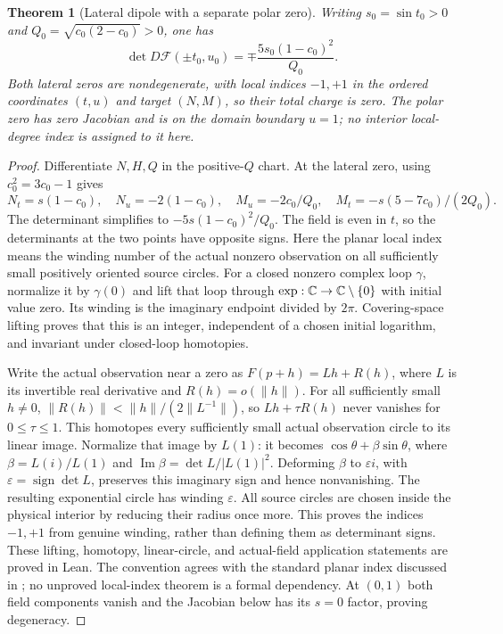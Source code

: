 \documentclass[11pt,a4paper]{article}
\newtheorem{theorem}{Theorem}[section]
\theoremstyle{definition}\newtheorem{definition}[theorem]{Definition}
\theoremstyle{remark}\newtheorem{remark}[theorem]{Remark}
\newcommand{\Map}{\mathcal F}\newcommand{\Pcore}{\mathcal P}
\begin{document}
\begin{theorem}[Lateral dipole with a separate polar zero]\label{thm:dipole}
Writing $s_0=\sin t_0>0$ and $Q_0=\sqrt{c_0(2-c_0)}>0$, one has
\[
 \det D\Map(\pm t_0,u_0)=\mp\frac{5s_0(1-c_0)^2}{Q_0}.
\]
Both lateral zeros are nondegenerate, with local indices $-1,+1$
in the ordered coordinates $(t,u)$ and target $(N,M)$, so their total
charge is zero. The polar zero has zero Jacobian and is on the domain
boundary $u=1$; no interior local-degree index is assigned to it here.
\end{theorem}
\begin{proof}
Differentiate $N,H,Q$ in the positive-$Q$ chart. At the lateral zero,
using $c_0^2=3c_0-1$ gives
\[
 N_t=s(1-c_0),\quad N_u=-2(1-c_0),\quad
 M_u=-2c_0/Q_0,\quad M_t=-s(5-7c_0)/(2Q_0).
\]
The determinant simplifies to $-5s(1-c_0)^2/Q_0$. The field is even
in $t$, so the determinants at the two points have opposite signs.
Here the planar local index means the winding number of the actual
nonzero observation on all sufficiently small positively oriented source
circles. For a closed nonzero complex loop $\gamma$, normalize it by
$\gamma(0)$ and lift that loop through $\exp:\mathbb C\to\mathbb C\setminus\{0\}$
with initial value zero. Its winding is the imaginary endpoint divided by
$2\pi$. Covering-space lifting proves that this is an integer, independent
of a chosen initial logarithm, and invariant under closed-loop homotopies.

Write the actual observation near a zero as $F(p+h)=Lh+R(h)$, where
$L$ is its invertible real derivative and $R(h)=o(\lVert h\rVert)$.
For all sufficiently small $h\ne0$,
$\lVert R(h)\rVert<\lVert h\rVert/(2\lVert L^{-1}\rVert)$,
so $Lh+\tau R(h)$ never vanishes for $0\leq\tau\leq1$.
This homotopes every sufficiently small actual observation circle to its
linear image. Normalize that image by $L(1)$: it becomes
$\cos\theta+\beta\sin\theta$, where $\beta=L(i)/L(1)$ and
$\operatorname{Im}\beta=\det L/|L(1)|^2$.
Deforming $\beta$ to $\varepsilon i$, with
$\varepsilon=\operatorname{sign}\det L$, preserves this imaginary sign
and hence nonvanishing. The resulting exponential circle has winding
$\varepsilon$. All source circles are chosen inside the physical interior
by reducing their radius once more. This proves the indices $-1,+1$
from genuine winding, rather than defining them as determinant signs.
These lifting, homotopy, linear-circle, and actual-field application
statements are proved in Lean. The convention agrees with the standard
planar index discussed in \cite{degree}; no unproved local-index theorem
is a formal dependency.
At $(0,1)$ both field components vanish and the Jacobian below has its
$s=0$ factor, proving degeneracy.
\end{proof}
\end{document}
